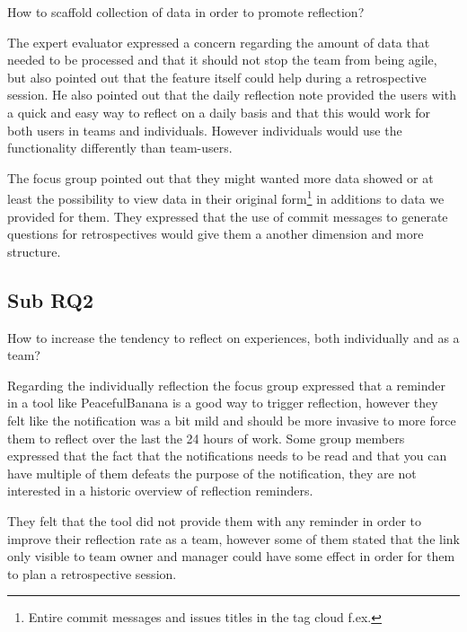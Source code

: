 \begin{center}
    How to scaffold collection of data in order to promote reflection? 
\end{center}

\noindent\makebox[\linewidth]{\rule{\textwidth}{0.5pt}} 
The expert evaluator expressed a concern regarding the amount of data that needed to be processed and that it should not stop the team from being agile, but also pointed out that the feature itself could help during a retrospective session. He also pointed out that the daily reflection note provided the users with a quick and easy way to reflect on a daily basis and that this would work for both users in teams and individuals. However individuals would use the functionality differently than team-users.

The focus group pointed out that they might wanted more data showed or at least the possibility to view data in their original form\footnote{Entire commit messages and issues titles in the tag cloud f.ex.} in additions to data we provided for them. They expressed that the use of commit messages to generate questions for retrospectives would give them a another dimension and more structure.

\subsection{Sub RQ2}
\noindent\makebox[\linewidth]{\rule{\textwidth}{0.5pt}} 

\begin{center}
How to increase the tendency to reflect on experiences, both individually and as a team? \\
\end{center}  

\noindent\makebox[\linewidth]{\rule{\textwidth}{0.5pt}}
Regarding the individually reflection the focus group expressed that a reminder in a tool like PeacefulBanana is a good way to trigger reflection, however they felt like the notification was a bit mild and should be more invasive to more force them to reflect over the last the 24 hours of work. Some group members expressed that the fact that the notifications needs to be read and that you can have multiple of them defeats the purpose of the notification, they are not interested in a historic overview of reflection reminders. 

They felt that the tool did not provide them with any reminder in order to improve their reflection rate as a team, however some of them stated that the link only visible to team owner and manager could have some effect in order for them to plan a retrospective session.

